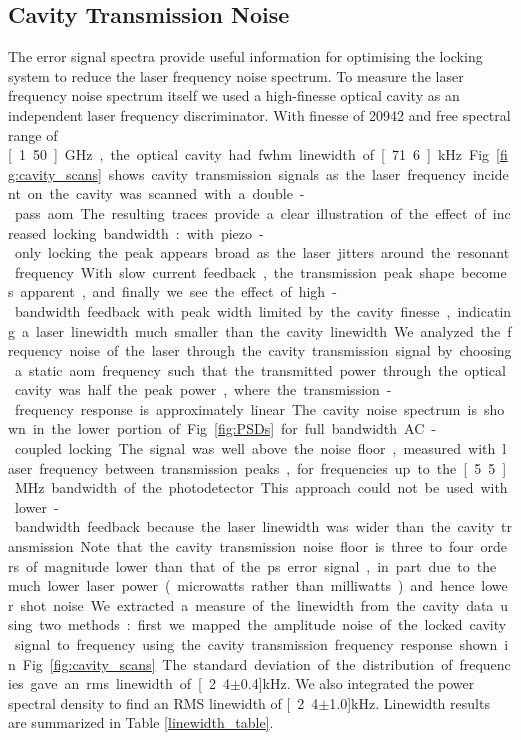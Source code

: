 \subsection{Cavity Transmission Noise}
The error signal spectra provide useful information for optimising the locking system to reduce the laser frequency noise spectrum.
To measure the laser frequency noise spectrum itself we used a high-finesse optical cavity as an independent laser frequency discriminator.
With finesse of 20942 and free spectral range of \unit[1.50]{GHz}, the optical cavity had \gls*{fwhm} linewidth of \unit[71.6]{kHz}.
Fig.~\ref{fig:cavity_scans} shows cavity transmission signals as the laser frequency incident on the cavity was scanned with a double-pass \gls*{aom}.
The resulting traces provide a clear illustration of the effect of increased locking bandwidth: with piezo-only locking the peak appears broad as the laser jitters around the resonant frequency.
With slow current feedback, the transmission peak shape becomes apparent, and finally we see the effect of high-bandwidth feedback with peak width limited by the cavity finesse, indicating a laser linewidth much smaller than the cavity linewidth.

We analyzed the frequency noise of the laser through the cavity transmission signal by choosing a static \gls*{aom} frequency such that the transmitted power through the optical cavity was half the peak power, where the transmission-frequency response is approximately linear. 

The cavity noise spectrum is shown in the lower portion of Fig.~\ref{fig:PSDs} for full bandwidth AC-coupled locking.
The signal was well above the noise floor, measured with laser frequency between transmission peaks, for frequencies up to the \unit[5.5]{MHz} bandwidth of the photodetector.
 This approach could not be used with lower-bandwidth feedback because the laser linewidth was wider than the cavity transmission.
 Note that the cavity transmission noise floor is three to four orders of magnitude lower than that of the \gls*{ps} error signal, in part due to the much lower laser power (microwatts rather than milliwatts) and hence lower shot noise.

We extracted a measure of the linewidth from the cavity data using two methods: first we mapped the amplitude noise of the locked cavity signal to frequency using the cavity transmission frequency response shown in Fig.~\ref{fig:cavity_scans}.
The standard deviation of the distribution of frequencies gave an \gls*{rms} linewidth of \unit[2.4$\pm$0.4]{kHz}.
We also integrated the power spectral density to find an RMS linewidth \cite{negnevitsky_wideband_2013} of \unit[2.4$\pm$1.0]{kHz}.
Linewidth results are summarized in Table \ref{linewidth_table}.

